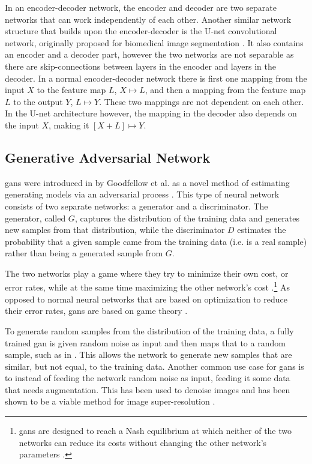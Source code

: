 In an encoder-decoder network, the encoder and decoder are two separate networks that can work independently of each other. Another similar network structure that builds upon the encoder-decoder is the U-net convolutional network, originally proposed for biomedical image segmentation \cite{unet}. It also contains an encoder and a decoder part, however the two networks are not separable as there are skip-connections between layers in the encoder and layers in the decoder. In a normal encoder-decoder network there is first one mapping from the input $X$ to the feature map $L$, $X \mapsto L$, and then a mapping from the feature map $L$ to the output $Y$, $L \mapsto Y$. These two mappings are not dependent on each other. In the U-net architecture however,  the mapping in the decoder also depends on the input $X$, making it $[X+L] \mapsto Y$. 


\subsection{Generative Adversarial Network}
\label{sec:ml:types:gan}
\gls{gan}s were introduced in \citeyear{goodfellow2014gan} by Goodfellow et al.  as a novel method of estimating generating models via an adversarial process \cite{goodfellow2014gan}. This type of neural network consists of two separate networks: a generator and a discriminator. The generator, called $G$, captures the distribution of the training data and generates new samples from that distribution, while the discriminator $D$ estimates the probability that a given sample came from the training data (i.e. is a real sample) rather than being a generated sample from $G$. 

The two networks play a game where they try to minimize their own cost, or error rates, while at the same time maximizing the other network's cost \cite{goodfellow2020gan}.\footnote{\gls{gan}s are designed to reach a Nash equilibrium at which neither of the two networks can reduce its costs without changing the other network's parameters \cite{liu2020tomogan}.} As opposed to normal neural networks that are based on optimization to reduce their error rates, \gls{gan}s are based on game theory \cite{goodfellow2020gan}. 

To generate random samples from the distribution of the training data, a fully trained \gls{gan} is given random noise as input and then maps that to a random sample, such as in \cite{zhangsagan}. This allows the network to generate new samples that are similar, but not equal, to the training data. Another common use case for \gls{gan}s is to instead of feeding the network random noise as input, feeding it some data that needs augmentation. This has been used to denoise images and has been shown to be a viable method for image super-resolution \cite{8710893,Ledig_2017_CVPR}. 

